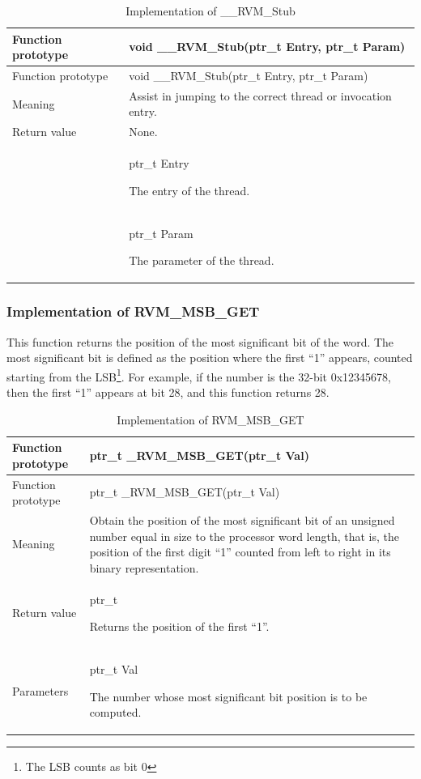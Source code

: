 \begin{xltabular}{\textwidth}{@{}>{\hsize\raggedright\arraybackslash}X>{\hsize\raggedright\arraybackslash}X@{}}
\caption{Implementation of \_\allowbreak{}\_\allowbreak{}RVM\_\allowbreak{}Stub}\label{tab:8-8}\\
\toprule
Function prototype & void \_\allowbreak{}\_\allowbreak{}RVM\_\allowbreak{}Stub(ptr\_\allowbreak{}t Entry, ptr\_\allowbreak{}t Param)\tabularnewline
\endfirsthead
\toprule
Function prototype & void \_\allowbreak{}\_\allowbreak{}RVM\_\allowbreak{}Stub(ptr\_\allowbreak{}t Entry, ptr\_\allowbreak{}t Param)\tabularnewline
\midrule
\endhead
\bottomrule
\endlastfoot
Meaning & Assist in jumping to the correct thread or invocation entry.\tabularnewline
Return value & None.\tabularnewline
{} & ptr\_\allowbreak{}t Entry

The entry of the thread.\strut
\tabularnewline
\strut
 & ptr\_\allowbreak{}t Param

The parameter of the thread.\strut
\tabularnewline
\end{xltabular}

\subsubsection{Implementation of RVM\_MSB\_GET}\label{subsubsec:8-2-6-3}

This function returns the position of the most significant bit of the word. The most significant bit is defined as the position where the first ``1'' appears, counted starting from the LSB\footnote{The LSB counts as bit 0}. For example, if the number is the 32-bit 0x12345678, then the first ``1'' appears at bit 28, and this function returns 28.

\begin{xltabular}{\textwidth}{@{}>{\hsize\raggedright\arraybackslash}X>{\hsize\raggedright\arraybackslash}X@{}}
\caption{Implementation of RVM\_\allowbreak{}MSB\_\allowbreak{}GET}\label{tab:8-9}\\
\toprule
Function prototype & ptr\_\allowbreak{}t \_\allowbreak{}RVM\_\allowbreak{}MSB\_\allowbreak{}GET(ptr\_\allowbreak{}t Val)\tabularnewline
\endfirsthead
\toprule
Function prototype & ptr\_\allowbreak{}t \_\allowbreak{}RVM\_\allowbreak{}MSB\_\allowbreak{}GET(ptr\_\allowbreak{}t Val)\tabularnewline
\midrule
\endhead
\bottomrule
\endlastfoot
Meaning &
Obtain the position of the most significant bit of an unsigned number equal in size to the processor word length, that is, the position of the first digit ``1'' counted from left to right in its binary representation.\tabularnewline
Return value\strut
 & ptr\_\allowbreak{}t

Returns the position of the first ``1''.\strut
\tabularnewline
Parameters\strut
 & ptr\_\allowbreak{}t Val

The number whose most significant bit position is to be computed.\strut
\tabularnewline
\end{xltabular}

